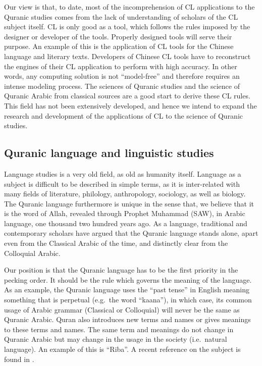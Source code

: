 \documentclass[
]{article}
\begin{document}
Our view is that, to date, most of the incomprehension of CL applications to the Quranic studies comes from the lack of understanding of scholars of the CL subject itself. CL is only good as a tool, which follows the rules imposed by the designer or developer of the tools. Properly designed tools will serve their purpose. An example of this is the application of CL tools for the Chinese language and literary texts. Developers of Chinese CL tools have to reconstruct the engines of their CL application to perform with high accuracy. In other words, any computing solution is not ``model-free'' and therefore requires an intense modeling process. The sciences of Quranic studies and the science of Quranic Arabic from classical sources are a good start to derive these CL rules. This field has not been extensively developed, and hence we intend to expand the research and development of the applications of CL to the science of Quranic studies.

\hypertarget{quranic-language-and-studies}{%
\subsection{Quranic language and linguistic studies}\label{quranic-language-and-studies}}

Language studies is a very old field, as old as humanity itself. Language as a subject is difficult to be described in simple terms, as it is inter-related with many fields of literature, philology, anthropology, sociology, as well as biology. The Quranic language furthermore is unique in the sense that, we believe that it is the word of Allah, revealed through Prophet Muhammad (SAW), in Arabic language, one thousand two hundred years ago. As a language, traditional and contemporary scholars have argued that the Quranic language stands alone, apart even from the Classical Arabic of the time, and distinctly clear from the Colloquial Arabic.

Our position is that the Quranic language has to be the first priority in the pecking order. It should be the rule which governs the meaning of the language. As an example, the Quranic language uses the ``past tense'' in English meaning something that is perpetual (e.g.~the word ``kaana''), in which case, its common usage of Arabic grammar (Classical or Colloquial) will never be the same as Quranic Arabic. Quran also introduces new terms and names or gives meanings to these terms and names. The same term and meanings do not change in Quranic Arabic but may change in the usage in the society (i.e.~natural language). An example of this is ``Riba''. A recent reference on the subject is found in \citep{saeh2015}.
\end{document}
